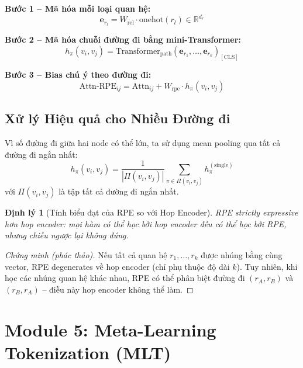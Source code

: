 \documentclass[12pt,a4paper]{article}
\newtheorem{theorem}{Định lý}[section]
\begin{document}
\begin{mathbox}[title={RPE với Path Transformer}]
\textbf{Bước 1 -- Mã hóa mỗi loại quan hệ:}
\begin{equation}
  \mathbf{e}_{r_l} = W_\text{rel} \cdot \text{onehot}(r_l) \in \mathbb{R}^{d_r}
\end{equation}

\textbf{Bước 2 -- Mã hóa chuỗi đường đi bằng mini-Transformer:}
\begin{equation}
  h_\pi(v_i, v_j) = \text{Transformer}_\text{path}(\mathbf{e}_{r_1}, \ldots, \mathbf{e}_{r_k})_{[\text{CLS}]}
  \label{eq:rpe_path}
\end{equation}

\textbf{Bước 3 -- Bias chú ý theo đường đi:}
\begin{equation}
  \text{Attn-RPE}_{ij} = \text{Attn}_{ij} + W_\text{rpe} \cdot h_\pi(v_i, v_j)
  \label{eq:rpe_attn}
\end{equation}
\end{mathbox}

\subsection{Xử lý Hiệu quả cho Nhiều Đường đi}

Vì số đường đi giữa hai node có thể lớn, ta sử dụng mean pooling qua tất cả
đường đi ngắn nhất:
\begin{equation}
  h_\pi(v_i, v_j) = \frac{1}{|\Pi(v_i,v_j)|}
    \sum_{\pi \in \Pi(v_i,v_j)} h_\pi^{(\text{single})}
\end{equation}
với $\Pi(v_i, v_j)$ là tập tất cả đường đi ngắn nhất.

\begin{theorem}[Tính biểu đạt của RPE so với Hop Encoder]
RPE strictly expressive hơn hop encoder: mọi hàm có thể học bởi hop encoder
đều có thể học bởi RPE, nhưng chiều ngược lại không đúng.
\end{theorem}

\begin{proof}[Chứng minh (phác thảo)]
Nếu tất cả quan hệ $r_1, \ldots, r_k$ được nhúng bằng cùng vector, RPE
degenerates về hop encoder (chỉ phụ thuộc độ dài $k$). Tuy nhiên, khi học
các nhúng quan hệ khác nhau, RPE có thể phân biệt đường đi $(r_A, r_B)$
và $(r_B, r_A)$ -- điều này hop encoder không thể làm.
\end{proof}

\section{Module 5: Meta-Learning Tokenization (MLT)}
\end{document}
